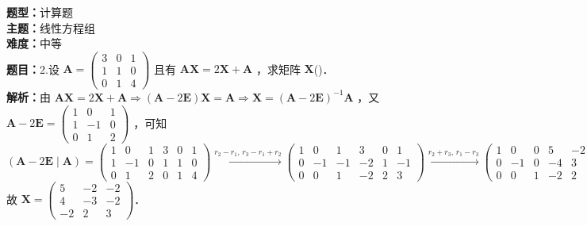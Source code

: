 \documentclass{ctexart}
\newenvironment{question}[5]{%
	\noindent\textbf{题型：}#1\\
	\textbf{主题：}#2\\
	\textbf{难度：}#3\\
	\textbf{题目：}#4\\
	\textbf{解析：}#5\\
	\vspace{1em}
}{}
\begin{document}
	\begin{question}
		{计算题}
		{线性方程组}
		{中等}
		{2.设 \(\mathbf{A}=\left(\begin{array}{ccc}3 & 0 & 1 \\ 1 & 1 & 0 \\ 0 & 1 & 4\end{array}\right)\) 且有 \(\mathbf{A X}=2 \mathbf{X}+\mathbf{A}\) ，求矩阵 \(\mathbf{X}\)(\qquad)．}
		{由 \(\mathbf{A X}=2 \mathbf{X}+\mathbf{A} \Rightarrow(\mathbf{A}-2 \mathbf{E}) \mathbf{X}=\mathbf{A} \Rightarrow \mathbf{X}=(\mathbf{A}-2 \mathbf{E})^{-1} \mathbf{A}\) ，又 \(\mathbf{A}-2 \mathbf{E}=\left(\begin{array}{ccc}1 & 0 & 1 \\ 1 & -1 & 0 \\ 0 & 1 & 2\end{array}\right)\) ，可知 \((\mathbf{A}-2 \mathbf{E} \mid \mathbf{A})=\left(\begin{array}{ccc|ccc}1 & 0 & 1 & 3 & 0 & 1 \\ 1 & -1 & 0 & 1 & 1 & 0 \\ 0 & 1 & 2 & 0 & 1 & 4\end{array}\right) \xrightarrow{r_2 - r_1,\, r_3 - r_1 + r_2} \left(\begin{array}{ccc|ccc}1 & 0 & 1 & 3 & 0 & 1 \\ 0 & -1 & -1 & -2 & 1 & -1 \\ 0 & 0 & 1 & -2 & 2 & 3\end{array}\right) \xrightarrow{r_2 + r_3,\, r_1 - r_3} \left(\begin{array}{ccc|ccc}1 & 0 & 0 & 5 & -2 & -2 \\ 0 & -1 & 0 & -4 & 3 & 2 \\ 0 & 0 & 1 & -2 & 2 & 3\end{array}\right)\) 故 \(\mathbf{X}=\left(\begin{array}{ccc}5 & -2 & -2 \\ 4 & -3 & -2 \\ -2 & 2 & 3\end{array}\right)\)．}
	\end{question}
	
\end{document}
